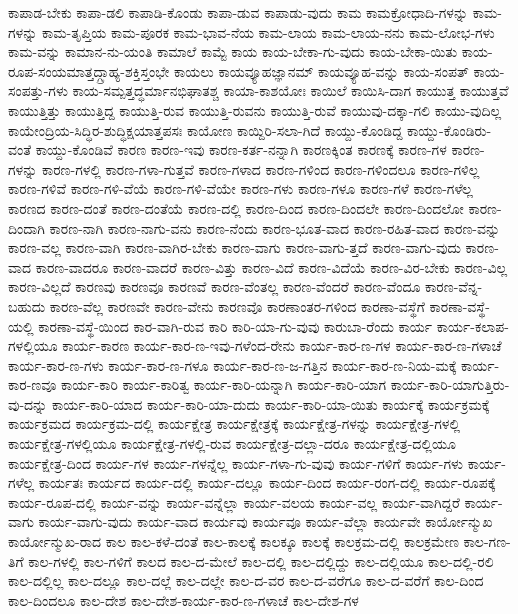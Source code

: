 {ಕಾಪಾಡ-ಬೇಕು
ಕಾಪಾ-ಡಲಿ
ಕಾಪಾಡಿ-ಕೊಂಡು
ಕಾಪಾ-ಡುವ
ಕಾಪಾಡು-ವುದು
ಕಾಮ
ಕಾಮಕ್ರೋಧಾದಿ-ಗಳನ್ನು
ಕಾಮ-ಗಳನ್ನು
ಕಾಮ-ತೃಪ್ತಿಯ
ಕಾಮ-ಪೂರಕ
ಕಾಮ-ಭಾವ-ನೆಯ
ಕಾಮ-ಲಾಯ
ಕಾಮ-ಲಾಯ-ನನು
ಕಾಮ-ಲೋಭ-ಗಳು
ಕಾಮ-ವನ್ನು
ಕಾಮಾನ-ನು-ಯಂತಿ
ಕಾಮಾಲೆ
ಕಾಮ್ಟೆ
ಕಾಯ
ಕಾಯ-ಬೇಕಾ-ಗು-ವುದು
ಕಾಯ-ಬೇಕಾ-ಯಿತು
ಕಾಯ-ರೂಪ-ಸಂಯಮಾತ್ತದ್ಗ್ರಾಹ್ಯ-ಶಕ್ತಿಸ್ತಂಭೇ
ಕಾಯಲು
ಕಾಯವ್ಯೂಹಜ್ಞಾನಮ್
ಕಾಯವ್ಯೂಹ-ವನ್ನು
ಕಾಯ-ಸಂಪತ್
ಕಾಯ-ಸಂಪತ್ತು-ಗಳು
ಕಾಯ-ಸಮ್ಪತ್ತದ್ಧರ್ಮಾನಭಿಘಾತಶ್ಚ
ಕಾಯಾ-ಕಾಶಯೋಃ
ಕಾಯಿಲೆ
ಕಾಯಿಸಿ-ದಾಗ
ಕಾಯುತ್ತ
ಕಾಯುತ್ತವೆ
ಕಾಯುತ್ತಿತ್ತು
ಕಾಯುತ್ತಿದ್ದ
ಕಾಯುತ್ತಿ-ರುವ
ಕಾಯುತ್ತಿ-ರುವನು
ಕಾಯುತ್ತಿ-ರುವೆ
ಕಾಯುವು-ದಕ್ಕಾ-ಗಲಿ
ಕಾಯು-ವುದಿಲ್ಲ
ಕಾಯೇಂದ್ರಿಯ-ಸಿದ್ಧಿರ-ಶುದ್ಧಿಕ್ಷಯಾತ್ತಪಸಃ
ಕಾಯೋಣ
ಕಾಯ್ದಿರಿ-ಸಲಾ-ಗಿದೆ
ಕಾಯ್ದು-ಕೊಂಡಿದ್ದ
ಕಾಯ್ದು-ಕೊಂಡಿರು-ವಂತೆ
ಕಾಯ್ದು-ಕೊಂಡಿವೆ
ಕಾರಣ
ಕಾರಣ-ಇವು
ಕಾರಣ-ಕರ್ತ-ನನ್ನಾಗಿ
ಕಾರಣಕ್ಕಿಂತ
ಕಾರಣಕ್ಕೆ
ಕಾರಣ-ಗಳ
ಕಾರಣ-ಗಳನ್ನು
ಕಾರಣ-ಗಳಲ್ಲಿ
ಕಾರಣ-ಗಳಾ-ಗುತ್ತವೆ
ಕಾರಣ-ಗಳಾದ
ಕಾರಣ-ಗಳಿಂದ
ಕಾರಣ-ಗಳಿಂದಲೂ
ಕಾರಣ-ಗಳಿಲ್ಲ
ಕಾರಣ-ಗಳಿವೆ
ಕಾರಣ-ಗಳಿ-ವೆಯೆ
ಕಾರಣ-ಗಳಿ-ವೆಯೇ
ಕಾರಣ-ಗಳು
ಕಾರಣ-ಗಳೂ
ಕಾರಣ-ಗಳೆ
ಕಾರಣ-ಗಳೆಲ್ಲ
ಕಾರಣದ
ಕಾರಣ-ದಂತೆ
ಕಾರಣ-ದಂತೆಯೆ
ಕಾರಣ-ದಲ್ಲಿ
ಕಾರಣ-ದಿಂದ
ಕಾರಣ-ದಿಂದಲೇ
ಕಾರಣ-ದಿಂದಲೋ
ಕಾರಣ-ದಿಂದಾಗಿ
ಕಾರಣ-ನಾಗಿ
ಕಾರಣ-ನಾಗು-ವನು
ಕಾರಣ-ನೆಂದು
ಕಾರಣ-ಭೂತ-ವಾದ
ಕಾರಣ-ರಹಿತ-ವಾದ
ಕಾರಣ-ವನ್ನು
ಕಾರಣ-ವಲ್ಲ
ಕಾರಣ-ವಾಗಿ
ಕಾರಣ-ವಾಗಿರ-ಬೇಕು
ಕಾರಣ-ವಾಗು
ಕಾರಣ-ವಾಗು-ತ್ತದೆ
ಕಾರಣ-ವಾಗು-ವುದು
ಕಾರಣ-ವಾದ
ಕಾರಣ-ವಾದರೂ
ಕಾರಣ-ವಾದರೆ
ಕಾರಣ-ವಿತ್ತು
ಕಾರಣ-ವಿದೆ
ಕಾರಣ-ವಿದೆಯೆ
ಕಾರಣ-ವಿರ-ಬೇಕು
ಕಾರಣ-ವಿಲ್ಲ
ಕಾರಣ-ವಿಲ್ಲದೆ
ಕಾರಣವು
ಕಾರಣವೂ
ಕಾರಣವೆ
ಕಾರಣ-ವೆಂತಲ್ಲ
ಕಾರಣ-ವೆಂದರೆ
ಕಾರಣ-ವೆಂದೂ
ಕಾರಣ-ವೆನ್ನ-ಬಹುದು
ಕಾರಣ-ವೆಲ್ಲ
ಕಾರಣವೇ
ಕಾರಣ-ವೇನು
ಕಾರಣವೊ
ಕಾರಣಾಂತರ-ಗಳಿಂದ
ಕಾರಣಾ-ವಸ್ಥೆಗೆ
ಕಾರಣಾ-ವಸ್ಥೆ-ಯಲ್ಲಿ
ಕಾರಣಾ-ವಸ್ಥೆ-ಯಿಂದ
ಕಾರ-ವಾಗಿ-ರುವ
ಕಾರಿ
ಕಾರಿ-ಯಾ-ಗು-ವುವು
ಕಾರುಬಾ-ರೆಂದು
ಕಾರ್ಯ
ಕಾರ್ಯ-ಕಲಾಪ-ಗಳಲ್ಲಿಯೂ
ಕಾರ್ಯ-ಕಾರಣ
ಕಾರ್ಯ-ಕಾರ-ಣ-ಇವು-ಗಳೆಂದ-ರೇನು
ಕಾರ್ಯ-ಕಾರ-ಣ-ಗಳ
ಕಾರ್ಯ-ಕಾರ-ಣ-ಗಳಾಚೆ
ಕಾರ್ಯ-ಕಾರ-ಣ-ಗಳು
ಕಾರ್ಯ-ಕಾರ-ಣ-ಗಳೂ
ಕಾರ್ಯ-ಕಾರ-ಣ-ಜ-ಗತ್ತಿನ
ಕಾರ್ಯ-ಕಾರ-ಣ-ನಿಯ-ಮಕ್ಕೆ
ಕಾರ್ಯ-ಕಾರ-ಣವೂ
ಕಾರ್ಯ-ಕಾರಿ
ಕಾರ್ಯ-ಕಾರಿತ್ವ
ಕಾರ್ಯ-ಕಾರಿ-ಯನ್ನಾಗಿ
ಕಾರ್ಯ-ಕಾರಿ-ಯಾಗ
ಕಾರ್ಯ-ಕಾರಿ-ಯಾಗುತ್ತಿರು-ವು-ದನ್ನು
ಕಾರ್ಯ-ಕಾರಿ-ಯಾದ
ಕಾರ್ಯ-ಕಾರಿ-ಯಾ-ದುದು
ಕಾರ್ಯ-ಕಾರಿ-ಯಾ-ಯಿತು
ಕಾರ್ಯಕ್ಕೆ
ಕಾರ್ಯಕ್ರಮಕ್ಕೆ
ಕಾರ್ಯಕ್ರಮದ
ಕಾರ್ಯಕ್ರಮ-ದಲ್ಲಿ
ಕಾರ್ಯಕ್ಷೇತ್ರ
ಕಾರ್ಯಕ್ಷೇತ್ರಕ್ಕೆ
ಕಾರ್ಯಕ್ಷೇತ್ರ-ಗಳನ್ನು
ಕಾರ್ಯಕ್ಷೇತ್ರ-ಗಳಲ್ಲಿ
ಕಾರ್ಯಕ್ಷೇತ್ರ-ಗಳಲ್ಲಿಯೂ
ಕಾರ್ಯಕ್ಷೇತ್ರ-ಗಳಲ್ಲಿ-ರುವ
ಕಾರ್ಯಕ್ಷೇತ್ರ-ದಲ್ಲಾ-ದರೂ
ಕಾರ್ಯಕ್ಷೇತ್ರ-ದಲ್ಲಿಯೂ
ಕಾರ್ಯಕ್ಷೇತ್ರ-ದಿಂದ
ಕಾರ್ಯ-ಗಳ
ಕಾರ್ಯ-ಗಳನ್ನೆಲ್ಲ
ಕಾರ್ಯ-ಗಳಾ-ಗು-ವುವು
ಕಾರ್ಯ-ಗಳಿಗೆ
ಕಾರ್ಯ-ಗಳು
ಕಾರ್ಯ-ಗಳೆಲ್ಲ
ಕಾರ್ಯತಃ
ಕಾರ್ಯದ
ಕಾರ್ಯ-ದಲ್ಲಿ
ಕಾರ್ಯ-ದಲ್ಲೂ
ಕಾರ್ಯ-ದಿಂದ
ಕಾರ್ಯ-ರಂಗ-ದಲ್ಲಿ
ಕಾರ್ಯ-ರೂಪಕ್ಕೆ
ಕಾರ್ಯ-ರೂಪ-ದಲ್ಲಿ
ಕಾರ್ಯ-ವನ್ನು
ಕಾರ್ಯ-ವನ್ನೆಲ್ಲಾ
ಕಾರ್ಯ-ವಲಯ
ಕಾರ್ಯ-ವಲ್ಲ
ಕಾರ್ಯ-ವಾಗಿದ್ದರೆ
ಕಾರ್ಯ-ವಾಗು
ಕಾರ್ಯ-ವಾಗು-ವುದು
ಕಾರ್ಯ-ವಾದ
ಕಾರ್ಯವು
ಕಾರ್ಯವೂ
ಕಾರ್ಯ-ವೆಲ್ಲಾ
ಕಾರ್ಯವೇ
ಕಾರ್ಯೋನ್ಮುಖ
ಕಾರ್ಯೋನ್ಮುಖ-ರಾದ
ಕಾಲ
ಕಾಲ-ಕಳೆ-ದಂತೆ
ಕಾಲ-ಕಾಲಕ್ಕೆ
ಕಾಲಕ್ಕೂ
ಕಾಲಕ್ಕೆ
ಕಾಲಕ್ರಮ-ದಲ್ಲಿ
ಕಾಲಕ್ರಮೇಣ
ಕಾಲ-ಗಣ-ತಿಗೆ
ಕಾಲ-ಗಳಲ್ಲಿ
ಕಾಲ-ಗಳಿಗೆ
ಕಾಲದ
ಕಾಲ-ದ-ಮೇಲೆ
ಕಾಲ-ದಲ್ಲಿ
ಕಾಲ-ದಲ್ಲಿದ್ದು
ಕಾಲ-ದಲ್ಲಿಯೂ
ಕಾಲ-ದಲ್ಲಿ-ರಲಿ
ಕಾಲ-ದಲ್ಲಿಲ್ಲ
ಕಾಲ-ದಲ್ಲೂ
ಕಾಲ-ದಲ್ಲೆ
ಕಾಲ-ದಲ್ಲೇ
ಕಾಲ-ದ-ವರ
ಕಾಲ-ದ-ವರೆಗೂ
ಕಾಲ-ದ-ವರೆಗೆ
ಕಾಲ-ದಿಂದ
ಕಾಲ-ದಿಂದಲೂ
ಕಾಲ-ದೇಶ
ಕಾಲ-ದೇಶ-ಕಾರ್ಯ-ಕಾರ-ಣ-ಗಳಾಚೆ
ಕಾಲ-ದೇಶ-ಗಳ
}
